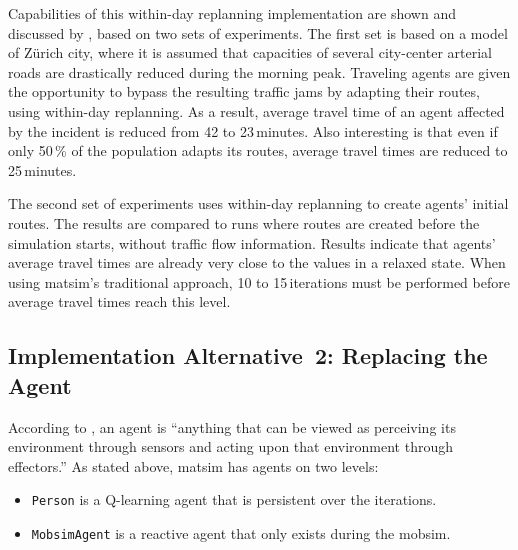 Capabilities of this within-day replanning implementation are shown and discussed by \citet{Dobler_PhDThesis_2013}, based on two sets of experiments. The first set is based on a model of Zürich city, where it is assumed that capacities of several city-center arterial roads are drastically reduced during the morning peak. Traveling agents are given the opportunity to bypass the resulting traffic jams by adapting their routes, using within-day replanning. As a result, average travel time of an agent affected by the incident is reduced from 42 to 23\,minutes. Also interesting is that even if only 50\,\% of the population adapts its routes, average travel times are reduced to 25\,minutes.

The second set of experiments uses within-day replanning to create agents' initial routes. The results are compared to runs where routes are created before the simulation starts, without traffic flow information. Results indicate that agents' average travel times are already very close to the values in a relaxed state. When using \gls{matsim}'s traditional approach, 10 to 15\,iterations must be performed before average travel times reach this level. %

\subsection{Implementation Alternative~2: Replacing the Agent}
\label{sec:impl-repl-the-ag}
According to \cite{RussellNorvigBook}, an agent is ``anything that can be viewed as perceiving its environment through sensors and acting upon that environment through effectors.''  As stated above, \gls{matsim} has agents on two levels:
%
\begin{itemize}\styleItemize
	\item \lstinline$Person$ is a Q-learning agent that is persistent over the iterations.
	\item \lstinline$MobsimAgent$ is a reactive agent that only exists during the \gls{mobsim}.
\end{itemize}

